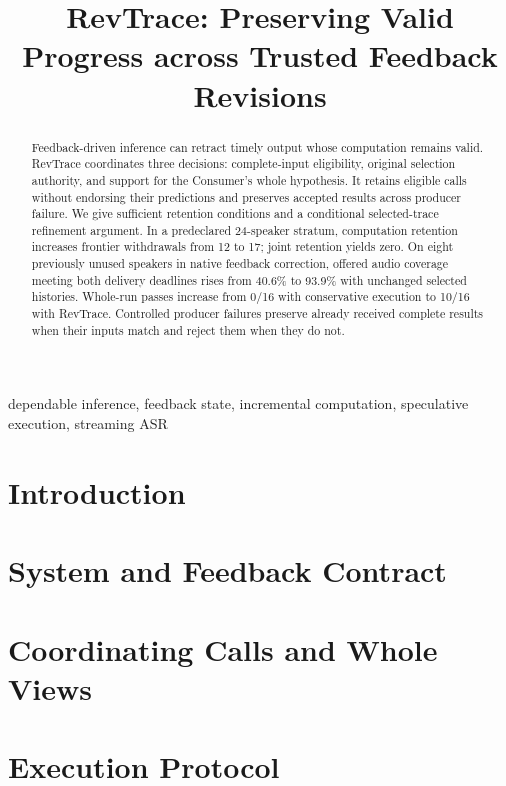 \documentclass[conference,10pt]{IEEEtran}
\begin{document}
\title{RevTrace: Preserving Valid Progress across Trusted Feedback Revisions}
\author{}
\maketitle
\begin{abstract}
Feedback-driven inference can retract timely output whose computation
remains valid. RevTrace coordinates three decisions: complete-input
eligibility, original selection authority, and support for the Consumer's
whole hypothesis. It retains eligible calls without endorsing their
predictions and preserves accepted results across producer failure.
We give sufficient retention conditions and a conditional selected-trace
refinement argument. In a predeclared 24-speaker stratum, computation
retention increases frontier withdrawals from 12 to 17; joint retention
yields zero. On eight previously unused speakers in native feedback
correction, offered audio coverage meeting both delivery deadlines rises
from 40.6\% to 93.9\% with unchanged selected histories. Whole-run passes
increase from 0/16 with conservative execution to 10/16 with RevTrace.
Controlled producer failures preserve already received complete results
when their inputs match and reject them when they do not.
\end{abstract}
\begin{IEEEkeywords}
dependable inference, feedback state, incremental computation, speculative execution, streaming ASR
\end{IEEEkeywords}
\section{Introduction}\label{sec:intro}

\section{System and Feedback Contract}\label{sec:contract}

\section{Coordinating Calls and Whole Views}\label{sec:continuation}





\section{Execution Protocol}\label{sec:protocol}


\end{document}
